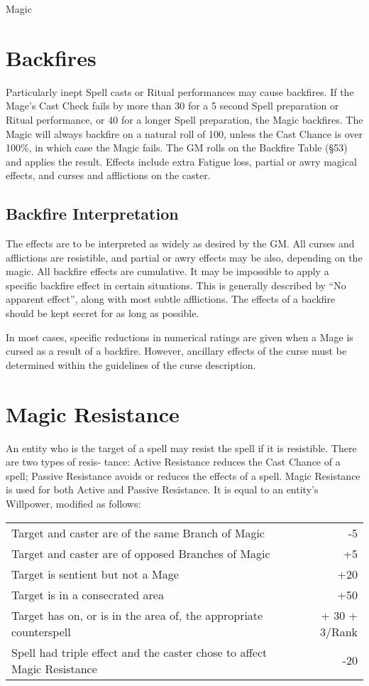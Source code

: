 \begin{Chapter}{Magic}
\section{Backfires}

Particularly inept Spell casts or Ritual performances may cause
backfires.  If the Mage’s Cast Check fails by more than 30 for a 5
second Spell preparation or Ritual performance, or 40 for a longer
Spell preparation, the Magic backfires. The Magic will always backfire
on a natural roll of 100, unless the Cast Chance is over 100\%, in
which case the Magic fails. The GM rolls on the Backfire Table (§53)
and applies the result.  Effects include extra Fatigue loss, partial
or awry magical effects, and curses and afflictions on the caster.

\subsection{Backfire Interpretation}

The effects are to be interpreted as widely as desired by the GM.  All
curses and afflictions are resistible, and partial or awry effects may
be also, depending on the magic.  All backfire effects are cumulative.
It may be impossible to apply a specific backfire effect in certain
situations.  This is generally described by “No apparent effect”,
along with most subtle afflictions. The effects of a backfire should
be kept secret for as long as possible.

In most cases, specific reductions in numerical ratings are given when
a Mage is cursed as a result of a backfire.  However, ancillary
effects of the curse must be determined within the guidelines of the
curse description.


\section{Magic Resistance}

An entity who is the target of a spell may resist the 
spell if it is resistible. There are two types of resis-
tance:  Active  Resistance  reduces  the  Cast  Chance 
of a spell; Passive Resistance avoids or reduces the 
effects of a spell. Magic Resistance is used for both 
Active  and  Passive  Resistance.  It  is  equal  to  an 
entity’s Willpower, modified as follows: 

\begin{tabularx}{\columnwidth}{Xr} 
Target and caster are of the same Branch of Magic			& -5 \\
Target and caster are of opposed Branches of Magic			& +5 \\
Target is sentient but not a Mage					& +20 \\
Target is in a consecrated area						& +50 \\
Target has on, or is in the area of, the appropriate counterspell	& + 30 + 3/Rank \\
Spell had triple effect and the caster chose to affect Magic Resistance	& -20 \\
\end{tabularx}


\end{Chapter}
